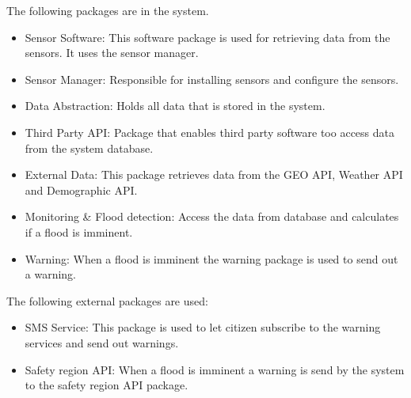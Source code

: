 The following packages are in the system.
	\begin{itemize}
	 \item Sensor Software: This software package is used for retrieving data from the sensors. It uses the sensor manager.
	 \item Sensor Manager: Responsible for installing sensors and configure the sensors.
	 \item Data Abstraction: Holds all data that is stored in the system.
	 \item Third Party API: Package that enables third party software too access data from the system database.
	 \item External Data: This package retrieves data from the GEO API, Weather API and Demographic API.
	 \item Monitoring \& Flood detection: Access the data from database and calculates if a flood is imminent. 
	 \item Warning: When a flood is imminent the warning package is used to send out a warning.
	\end{itemize}

The following external packages are used:
\begin{itemize}
	\item SMS Service: This package is used to let citizen subscribe to the warning services and send out warnings.
	\item Safety region API: When a flood is imminent a warning is send by the system to the safety region API package.
\end{itemize}
